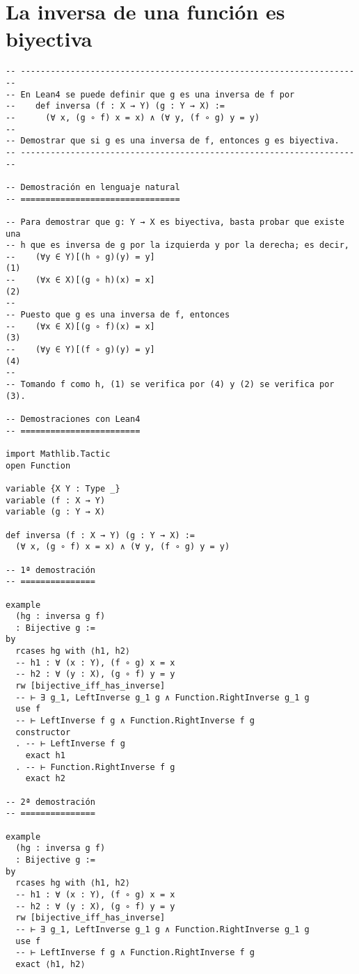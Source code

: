 \section{La inversa de una función es biyectiva}
\label{sec:org7838b37}
\begin{verbatim}
-- ---------------------------------------------------------------------
-- En Lean4 se puede definir que g es una inversa de f por
--    def inversa (f : X → Y) (g : Y → X) :=
--      (∀ x, (g ∘ f) x = x) ∧ (∀ y, (f ∘ g) y = y)
--
-- Demostrar que si g es una inversa de f, entonces g es biyectiva.
-- ---------------------------------------------------------------------

-- Demostración en lenguaje natural
-- ================================

-- Para demostrar que g: Y → X es biyectiva, basta probar que existe una
-- h que es inversa de g por la izquierda y por la derecha; es decir,
--    (∀y ∈ Y)[(h ∘ g)(y) = y]                                       (1)
--    (∀x ∈ X)[(g ∘ h)(x) = x]                                       (2)
--
-- Puesto que g es una inversa de f, entonces
--    (∀x ∈ X)[(g ∘ f)(x) = x]                                       (3)
--    (∀y ∈ Y)[(f ∘ g)(y) = y]                                       (4)
--
-- Tomando f como h, (1) se verifica por (4) y (2) se verifica por (3).

-- Demostraciones con Lean4
-- ========================

import Mathlib.Tactic
open Function

variable {X Y : Type _}
variable (f : X → Y)
variable (g : Y → X)

def inversa (f : X → Y) (g : Y → X) :=
  (∀ x, (g ∘ f) x = x) ∧ (∀ y, (f ∘ g) y = y)

-- 1ª demostración
-- ===============

example
  (hg : inversa g f)
  : Bijective g :=
by
  rcases hg with ⟨h1, h2⟩
  -- h1 : ∀ (x : Y), (f ∘ g) x = x
  -- h2 : ∀ (y : X), (g ∘ f) y = y
  rw [bijective_iff_has_inverse]
  -- ⊢ ∃ g_1, LeftInverse g_1 g ∧ Function.RightInverse g_1 g
  use f
  -- ⊢ LeftInverse f g ∧ Function.RightInverse f g
  constructor
  . -- ⊢ LeftInverse f g
    exact h1
  . -- ⊢ Function.RightInverse f g
    exact h2

-- 2ª demostración
-- ===============

example
  (hg : inversa g f)
  : Bijective g :=
by
  rcases hg with ⟨h1, h2⟩
  -- h1 : ∀ (x : Y), (f ∘ g) x = x
  -- h2 : ∀ (y : X), (g ∘ f) y = y
  rw [bijective_iff_has_inverse]
  -- ⊢ ∃ g_1, LeftInverse g_1 g ∧ Function.RightInverse g_1 g
  use f
  -- ⊢ LeftInverse f g ∧ Function.RightInverse f g
  exact ⟨h1, h2⟩


\end{verbatim}
